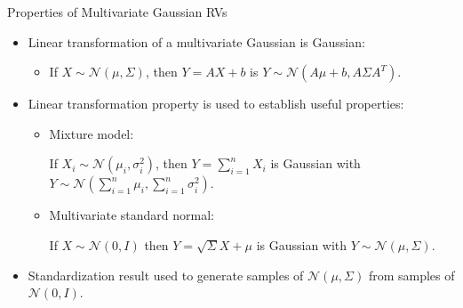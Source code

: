 \documentclass[9pt]{beamer}
\begin{document}
%
\begin{frame}{Properties of Multivariate Gaussian RVs}

\begin{itemize}
\setlength{\itemsep}{5pt}
\item Linear transformation of a multivariate Gaussian is Gaussian: 
\begin{itemize}
\setlength{\itemsep}{5pt}
\item If $X\sim\mathcal{N}(\mu,\Sigma)$, then $Y=AX+b$ is $Y\sim \mathcal{N}(A\mu+b,A\Sigma A^T)$. 
\end{itemize}
\vspace{0.1in}
\item Linear transformation property is used to establish useful properties:
\begin{itemize}
\setlength{\itemsep}{5pt}
\item Mixture model:

 If $X_i\sim \mathcal{N}(\mu_i,\sigma_i^2)$, then $Y=\sum_{i=1}^nX_i$ is Gaussian with $Y\sim\mathcal{N}(\sum_{i=1}^n\mu_i,\sum_{i=1}^n\sigma_i^2)$. 
 \vspace{0.1in}
\item Multivariate standard normal: 

If $X\sim\mathcal{N}(0,{I})$ then $Y=\sqrt{\Sigma}X+\mu$ is Gaussian with $Y\sim\mathcal{N}(\mu,\Sigma)$.
\end{itemize}
\item Standardization result used to generate samples of $\mathcal{N}(\mu,\Sigma)$ from samples of $\mathcal{N}(0,I)$.
\end{itemize}

\end{frame}
\end{document}

